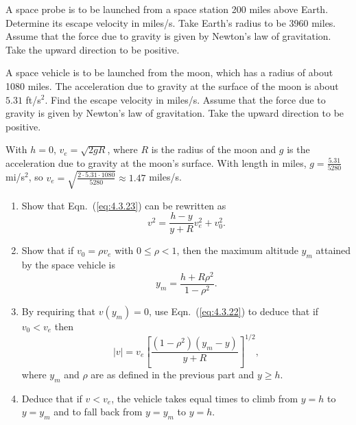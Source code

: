 \documentclass{ximera}
\begin{document}
\begin{problem}\label{exer:4.3.17}
A space probe is to be launched from a space station 200
miles above Earth.  Determine its escape velocity in
miles/s.  Take Earth's radius to be 3960 miles.  Assume
that the
force due to gravity is given by Newton's law of gravitation. Take the
upward direction to be positive.
\end{problem}

\begin{problem}\label{exer:4.3.18}
A space vehicle is to be launched from the moon, which has a
radius of about 1080 miles.  The acceleration due to
gravity at the surface of the moon is about $5.31$
ft/s$^2$.  Find the escape velocity in miles/s.  Assume
that the
force due to gravity is given by Newton's law of gravitation. Take the
upward direction to be positive.

\begin{solution}
With $h=0$, $v_e=\sqrt{2gR}$, where $R$ is the radius of the moon and
$g$ is the acceleration due to gravity at the moon's surface. With
length in miles, $g=\frac{5.31}{5280}$ mi/s$^2$, so
$v_e=\sqrt{\frac{2\cdot5.31\cdot1080}{5280}} \approx 1.47$
miles/s.
\end{solution}
\end{problem}

\begin{problem}\label{exer:4.3.19}
\begin{enumerate}
\item %
Show that Eqn.~(\ref{eq:4.3.23})  can be rewritten as
$$
v^2=\frac{h-y}{y+R} v^2_e+v_0^2.
$$

\item %
Show that if $v_0=\rho v_e$ with $ 0\le \rho < 1$, then
the maximum altitude $y_m$ attained by the space
vehicle is
$$
y_m=\frac{h+R\rho^2}{1-\rho^2}.
$$

\item %
By requiring that $v(y_m)=0$, use Eqn.~(\ref{eq:4.3.22}) to
deduce that if $v_0 < v_e$ then
$$
|v|=v_e\left[\frac{(1-\rho^2)(y_m-y)}{y+R}\right]^{1/2},
$$
where $y_m$ and $\rho$ are as defined in the previous part and
$y \ge h$.

\item %
Deduce that if $v < v_e$,  the vehicle takes
equal times to climb from $y=h$ to $y=y_m$ and to
fall back from $y=y_m$ to $y=h$.
\end{enumerate}
\end{problem}
\end{document}
